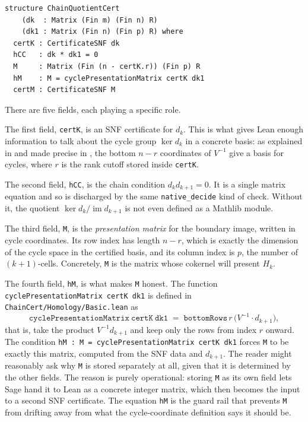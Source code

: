 \documentclass[11pt]{article}
\theoremstyle{plain}
\theoremstyle{definition}
\theoremstyle{remark}
\newcommand{\lean}[1]{\lstinline[language=lean]|#1|}
\begin{document}
\begin{lstlisting}[caption={The chain quotient certificate.},label={lst:chain-quotient-certificate}]
structure ChainQuotientCert
    (dk  : Matrix (Fin m) (Fin n) R)
    (dk1 : Matrix (Fin n) (Fin p) R) where
  certK : CertificateSNF dk
  hCC   : dk * dk1 = 0
  M     : Matrix (Fin (n - certK.r)) (Fin p) R
  hM    : M = cyclePresentationMatrix certK dk1
  certM : CertificateSNF M
\end{lstlisting}

There are five fields, each playing a specific role.

The first field, \lean{certK}, is an SNF certificate for \(d_k\). This is what
gives Lean enough information to talk about the cycle group \(\ker d_k\) in a
concrete basis: as explained in  and made precise in
, the bottom \(n - r\) coordinates of \(V^{-1}\) give a
basis for cycles, where \(r\) is the rank cutoff stored inside \lean{certK}.

The second field, \lean{hCC}, is the chain condition \(d_k d_{k+1} = 0\). It
is a single matrix equation and so is discharged by the same
\lean{native_decide} kind of check. Without it, the quotient
\(\ker d_k / \operatorname{im} d_{k+1}\) is not even defined as a Mathlib
module.

The third field, \lean{M}, is the \emph{presentation matrix} for the boundary
image, written in cycle coordinates. Its row index has length \(n - r\),
which is exactly the dimension of the cycle space in the certified basis, and
its column index is \(p\), the number of \((k+1)\)-cells. Concretely,
\lean{M} is the matrix whose cokernel will present \(H_k\).

The fourth field, \lean{hM}, is what makes \lean{M} honest. The function
\lean{cyclePresentationMatrix certK dk1} is defined in
\lean{ChainCert/Homology/Basic.lean} as
\[
    \mathtt{cyclePresentationMatrix\ certK\ dk1}
      \;=\; \mathtt{bottomRows}\, r\, \bigl(V^{-1} \cdot d_{k+1}\bigr),
\]
that is, take the product \(V^{-1} d_{k+1}\) and keep only the rows from index
\(r\) onward. The condition \lean{hM : M = cyclePresentationMatrix certK dk1}
forces \lean{M} to be exactly this matrix, computed from the SNF data and
\(d_{k+1}\). The reader might reasonably ask why \lean{M} is stored
separately at all, given that it is determined by the other fields. The reason
is purely operational: storing \lean{M} as its own field lets Sage hand it to
Lean as a concrete integer matrix, which then becomes the input to a second
SNF certificate. The equation \lean{hM} is the guard rail that prevents
\lean{M} from drifting away from what the cycle-coordinate definition says it
should be.
\end{document}
